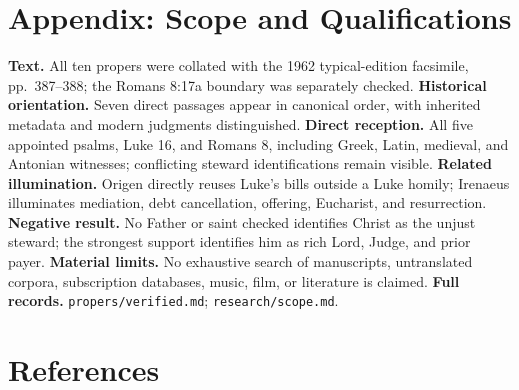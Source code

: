 \section*{Appendix: Scope and Qualifications}

\begin{studyframe}
\textbf{Text.} All ten propers were collated with the 1962 typical-edition facsimile, pp.~387--388; the Romans 8:17a boundary was separately checked. \textbf{Historical orientation.} Seven direct passages appear in canonical order, with inherited metadata and modern judgments distinguished. \textbf{Direct reception.} All five appointed psalms, Luke 16, and Romans 8, including Greek, Latin, medieval, and Antonian witnesses; conflicting steward identifications remain visible. \textbf{Related illumination.} Origen directly reuses Luke's bills outside a Luke homily; Irenaeus illuminates mediation, debt cancellation, offering, Eucharist, and resurrection. \textbf{Negative result.} No Father or saint checked identifies Christ as the unjust steward; the strongest support identifies him as rich Lord, Judge, and prior payer. \textbf{Material limits.} No exhaustive search of manuscripts, untranslated corpora, subscription databases, music, film, or literature is claimed. \textbf{Full records.} \nolinkurl{propers/verified.md}; \nolinkurl{research/scope.md}.
\end{studyframe}

\section*{References}

